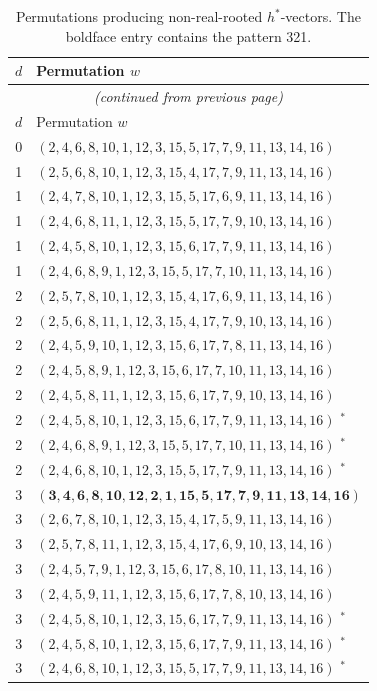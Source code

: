 \documentclass[11pt,reqno]{amsart}
\theoremstyle{definition}
\begin{document}
\begin{longtable}{rl}
\caption{Permutations producing non-real-rooted $h^*$-vectors.
  The boldface entry contains the pattern 321.
}\label{tab:perms}\\
\toprule
$d$ & Permutation $w$ \\
\midrule
\endfirsthead
\multicolumn{2}{c}{\small\itshape (continued from previous page)}\\
\toprule
$d$ & Permutation $w$ \\
\midrule
\endhead
\bottomrule
\endlastfoot

0 & $(2,4,6,8,10,1,12,3,15,5,17,7,9,11,13,14,16)$ \\
\midrule
1 & $(2,5,6,8,10,1,12,3,15,4,17,7,9,11,13,14,16)$ \\
1 & $(2,4,7,8,10,1,12,3,15,5,17,6,9,11,13,14,16)$ \\
1 & $(2,4,6,8,11,1,12,3,15,5,17,7,9,10,13,14,16)$ \\
1 & $(2,4,5,8,10,1,12,3,15,6,17,7,9,11,13,14,16)$ \\
1 & $(2,4,6,8,9,1,12,3,15,5,17,7,10,11,13,14,16)$ \\
\midrule
2 & $(2,5,7,8,10,1,12,3,15,4,17,6,9,11,13,14,16)$ \\
2 & $(2,5,6,8,11,1,12,3,15,4,17,7,9,10,13,14,16)$ \\
2 & $(2,4,5,9,10,1,12,3,15,6,17,7,8,11,13,14,16)$ \\
2 & $(2,4,5,8,9,1,12,3,15,6,17,7,10,11,13,14,16)$ \\
2 & $(2,4,5,8,11,1,12,3,15,6,17,7,9,10,13,14,16)$ \\
2 & $(2,4,5,8,10,1,12,3,15,6,17,7,9,11,13,14,16)$ $^{*}$ \\
2 & $(2,4,6,8,9,1,12,3,15,5,17,7,10,11,13,14,16)$ $^{*}$ \\
2 & $(2,4,6,8,10,1,12,3,15,5,17,7,9,11,13,14,16)$ $^{*}$ \\
\midrule
3 & $\mathbf{(3,4,6,8,10,12,2,1,15,5,17,7,9,11,13,14,16)}$ \\
3 & $(2,6,7,8,10,1,12,3,15,4,17,5,9,11,13,14,16)$ \\
3 & $(2,5,7,8,11,1,12,3,15,4,17,6,9,10,13,14,16)$ \\
3 & $(2,4,5,7,9,1,12,3,15,6,17,8,10,11,13,14,16)$ \\
3 & $(2,4,5,9,11,1,12,3,15,6,17,7,8,10,13,14,16)$ \\
3 & $(2,4,5,8,10,1,12,3,15,6,17,7,9,11,13,14,16)$ $^{*}$ \\
3 & $(2,4,5,8,10,1,12,3,15,6,17,7,9,11,13,14,16)$ $^{*}$ \\
3 & $(2,4,6,8,10,1,12,3,15,5,17,7,9,11,13,14,16)$ $^{*}$ \\
\end{longtable}
\end{document}
